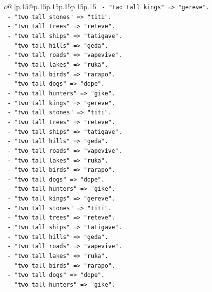 \documentclass{article}
\begin{document}
{\begin{supertabular}{c@{$\;$}|p{.15\linewidth}@{}p{.15\linewidth}p{.15\linewidth}p{.15\linewidth}p{.15\linewidth}p{.15\linewidth}}
{{{\texttt{    {-} "two tall kings" => "gereve".} \\
\texttt{    {-} "two tall stones" => "titi".} \\
\texttt{    {-} "two tall trees" => "reteve".} \\
\texttt{    {-} "two tall ships" => "tatigave".} \\
\texttt{    {-} "two tall hills" => "geda".} \\
\texttt{    {-} "two tall roads" => "vapevive".} \\
\texttt{    {-} "two tall lakes" => "ruka".} \\
\texttt{    {-} "two tall birds" => "rarapo".} \\
\texttt{    {-} "two tall dogs" => "dope".} \\
\texttt{    {-} "two tall hunters" => "gike".} \\
\texttt{    {-} "two tall kings" => "gereve".} \\
\texttt{    {-} "two tall stones" => "titi".} \\
\texttt{    {-} "two tall trees" => "reteve".} \\
\texttt{    {-} "two tall ships" => "tatigave".} \\
\texttt{    {-} "two tall hills" => "geda".} \\
\texttt{    {-} "two tall roads" => "vapevive".} \\
\texttt{    {-} "two tall lakes" => "ruka".} \\
\texttt{    {-} "two tall birds" => "rarapo".} \\
\texttt{    {-} "two tall dogs" => "dope".} \\
\texttt{    {-} "two tall hunters" => "gike".} \\
\texttt{    {-} "two tall kings" => "gereve".} \\
\texttt{    {-} "two tall stones" => "titi".} \\
\texttt{    {-} "two tall trees" => "reteve".} \\
\texttt{    {-} "two tall ships" => "tatigave".} \\
\texttt{    {-} "two tall hills" => "geda".} \\
\texttt{    {-} "two tall roads" => "vapevive".} \\
\texttt{    {-} "two tall lakes" => "ruka".} \\
\texttt{    {-} "two tall birds" => "rarapo".} \\
\texttt{    {-} "two tall dogs" => "dope".} \\
\texttt{    {-} "two tall hunters" => "gike".} \\
}}}
\end{supertabular}}
\end{document}
